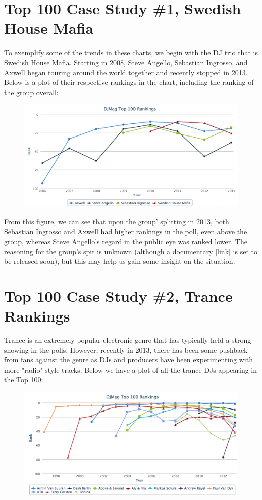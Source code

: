 \documentclass[12pt]{dalcsthesis}
\begin{document}
\section{Top 100 Case Study \#1, Swedish House Mafia}

To exemplify some of the trends in these charts, we begin with the DJ trio that is Swedish House Mafia. Starting in 2008, Steve Angello, Sebastian Ingrosso, and Axwell began touring around the world together and recently stopped in 2013. Below is a plot of their respective rankings in the chart, including the ranking of the group overall: \newpage

\begin{figure}[h]
\includegraphics[scale=.65]{shm_graph}
\centering
\end{figure}

From this figure, we can see that upon the group' splitting in 2013, both Sebastian Ingrosso and Axwell had higher rankings in the poll, even above the group, whereas Steve Angello's regard in the public eye was ranked lower. The reasoning for the group's spit is unknown (although a documentary [link] is set to be released soon), but this may help us gain some insight on the situation.

\section{Top 100 Case Study \#2, Trance Rankings}

Trance is an extremely popular electronic genre that has typically held a strong showing in the polls. However, recently in 2013, there has been some pushback from fans against the genre as DJs and producers have been experimenting with more "radio" style tracks. Below we have a plot of all the trance DJs appearing in the Top 100:

\begin{figure}[h]
\includegraphics[scale=.4]{trance_graph}
\centering
\end{figure}
\end{document}

